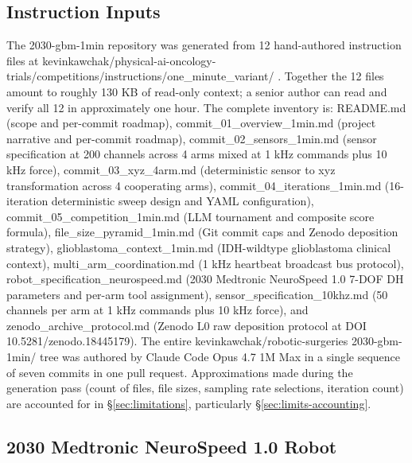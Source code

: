 
\subsection{Instruction Inputs}
\label{sec:methods-inputs}

The 2030-gbm-1min repository was generated from 12 hand-authored
instruction files at
kevinkawchak/physical-ai-oncology-trials/competitions/instructions/one_minute_variant/
\cite{one-minute-variant-instructions}. Together the 12 files amount
to roughly 130 KB of read-only context; a senior author can read and
verify all 12 in approximately one hour. The complete inventory is:
README.md (scope and per-commit roadmap), commit_01_overview_1min.md
(project narrative and per-commit roadmap),
commit_02_sensors_1min.md (sensor specification at 200 channels
across 4 arms mixed at 1 kHz commands plus 10 kHz force),
commit_03_xyz_4arm.md (deterministic sensor to xyz transformation
across 4 cooperating arms), commit_04_iterations_1min.md (16-iteration
deterministic sweep design and YAML configuration),
commit_05_competition_1min.md (LLM tournament and composite score
formula), file_size_pyramid_1min.md (Git commit caps and Zenodo
deposition strategy), glioblastoma_context_1min.md (IDH-wildtype
glioblastoma clinical context), multi_arm_coordination.md (1 kHz
heartbeat broadcast bus protocol), robot_specification_neurospeed.md
(2030 Medtronic NeuroSpeed 1.0 7-DOF DH parameters and per-arm tool
assignment), sensor_specification_10khz.md (50 channels per arm at
1 kHz commands plus 10 kHz force), and zenodo_archive_protocol.md
(Zenodo L0 raw deposition protocol at DOI
10.5281/zenodo.18445179). The entire kevinkawchak/robotic-surgeries
2030-gbm-1min/ tree was authored by Claude Code Opus 4.7 1M Max
\cite{claude-opus-47, claude-code} in a single sequence of seven
commits in one pull request. Approximations made during the
generation pass (count of files, file sizes, sampling rate
selections, iteration count) are accounted for in
\S\ref{sec:limitations}, particularly
\S\ref{sec:limits-accounting}.

\subsection{2030 Medtronic NeuroSpeed 1.0 Robot}
\label{sec:methods-robot}

